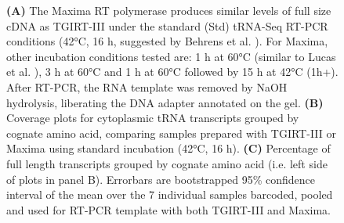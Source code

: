 \begin{figure}[ht]
    \centering
    \caption[RT readthrough comparing TGIRT to Maxima.]{
    \textbf{(A)} The Maxima RT polymerase produces similar levels of full size cDNA as TGIRT-III under the standard (Std) tRNA-Seq RT-PCR conditions (42°C, 16 h, suggested by Behrens et al. \cite{Behrens2021-gb}).
    For Maxima, other incubation conditions tested are: 1 h at 60°C (similar to Lucas et al. \cite{Lucas2023-vm}), 3 h at 60°C and 1 h at 60°C followed by 15 h at 42°C (1h+).
    After RT-PCR, the RNA template was removed by NaOH hydrolysis, liberating the DNA adapter annotated on the gel.
    \textbf{(B)} Coverage plots for cytoplasmic tRNA transcripts grouped by cognate amino acid, comparing samples prepared with TGIRT-III or Maxima using standard incubation (42°C, 16 h).
    \textbf{(C)} Percentage of full length transcripts grouped by cognate amino acid (i.e. left side of plots in panel B).
    Errorbars are bootstrapped 95\% confidence interval of the mean over the 7 individual samples barcoded, pooled and used for RT-PCR template with both TGIRT-III and Maxima.
    }
    \label{ch5:figsupp:f2S6}
\end{figure}


